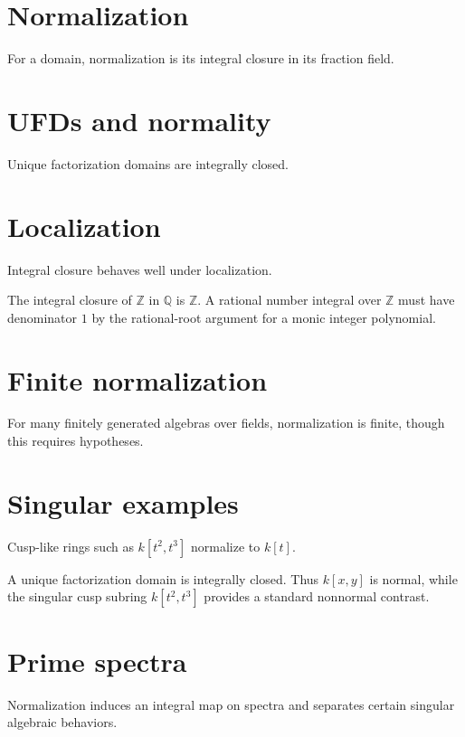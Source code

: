 \section{Normalization}
For a domain, normalization is its integral closure in its fraction field.

\section{UFDs and normality}
Unique factorization domains are integrally closed.

\section{Localization}
Integral closure behaves well under localization.

\begin{example}\label{ex:v20-expand-02}
The integral closure of $\mathbb Z$ in $\mathbb Q$ is $\mathbb Z$. A rational number integral over $\mathbb Z$ must have denominator $1$ by the rational-root argument for a monic integer polynomial.
\end{example}
\section{Finite normalization}
For many finitely generated algebras over fields, normalization is finite, though this requires hypotheses.

\section{Singular examples}
Cusp-like rings such as $k[t^2,t^3]$ normalize to $k[t]$.

\begin{example}\label{ex:v20-expand-03}
A unique factorization domain is integrally closed. Thus $k[x,y]$ is normal, while the singular cusp subring $k[t^2,t^3]$ provides a standard nonnormal contrast.
\end{example}
\section{Prime spectra}
Normalization induces an integral map on spectra and separates certain singular algebraic behaviors.

